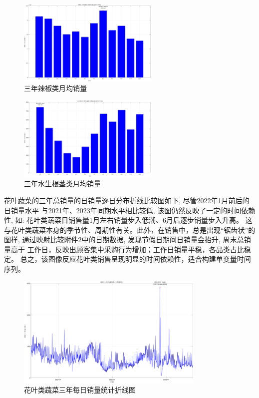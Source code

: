 \documentclass{cumcmthesis}
\begin{document}
\begin{figure}[H]
    \centering
    \includegraphics[width=0.6\textwidth]{三年辣椒类月均销量.png} 
    \caption{三年辣椒类月均销量}
\end{figure}

\begin{figure}[H]
    \centering
    \includegraphics[width=0.6\textwidth]{三年水生根茎类月均销量.png} 
    \caption{三年水生根茎类月均销量}
\end{figure}



花叶蔬菜的三年总销量的日销量逐日分布折线比较图如下, 尽管2022年1月前后的日销量水平
与2021年、2023年同期水平相比较低, 该图仍然反映了一定的时间依赖性, 
如: 花叶类蔬菜日销售量1月左右销量步入低潮、6月后逐步销量步入升高。
这与花叶类蔬菜本身的季节性、周期性有关。此外，在销售中，总是出现“锯齿状”的
图样, 通过映射比较附件2中的日期数据, 发现节假日期间日销量会抬升, 周末总销量高于
工作日，反映出顾客集中采购行为增加；工作日销量平稳，各品类占比稳定。
总之，该图像反应花叶类销售呈现明显的时间依赖性，适合构建单变量时间序列。

\begin{figure}[H]
    \centering
    \includegraphics[width=0.8\textwidth]{花叶三年间蔬菜每日销量统计.png} 
    \caption{花叶类蔬菜三年每日销量统计折线图}
\end{figure}
\end{document}
